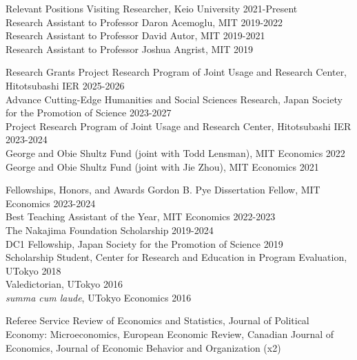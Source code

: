 \documentclass{resume} %
\begin{document}
\clearpage
\begin{rSection}{Relevant Positions}
Visiting Researcher, Keio University \hfill 2021-Present \\
Research Assistant to Professor Daron Acemoglu, MIT \hfill 2019-2022\\
Research Assistant to Professor David Autor, MIT \hfill 2019-2021\\
Research Assistant to Professor Joshua Angrist, MIT \hfill 2019
\end{rSection}

\begin{rSection}{Research Grants}
Project Research Program of Joint Usage and Research Center, Hitotsubashi IER \hfill 2025-2026\\
Advance Cutting-Edge Humanities and Social Sciences Research, Japan Society for the Promotion of Science
 \hfill 2023-2027\\
Project Research Program of Joint Usage and Research Center, Hitotsubashi IER \hfill 2023-2024\\
George and Obie Shultz Fund (joint with Todd Lensman), MIT Economics \hfill 2022\\
George and Obie Shultz Fund (joint with Jie Zhou), MIT  Economics \hfill 2021
\end{rSection}

\begin{rSection}{Fellowships, Honors, and Awards}
Gordon B. Pye Dissertation Fellow, MIT Economics \hfill 2023-2024\\
Best Teaching Assistant of the Year, MIT Economics \hfill 2022-2023\\
The Nakajima Foundation Scholarship \hfill 2019-2024\\
DC1 Fellowship, Japan Society for the Promotion of Science
 \hfill 2019\\
Scholarship Student, Center for Research and Education in Program Evaluation, UTokyo \hfill 2018\\
Valedictorian, UTokyo \hfill 2016\\
\textit{summa cum laude}, UTokyo Economics \hfill 2016
\end{rSection}

\begin{rSection}{Referee Service}
Review of Economics and Statistics, Journal of Political Economy: Microeconomics, European Economic Review, Canadian Journal of Economics, Journal of Economic Behavior and Organization (x2)
\end{rSection}
\end{document}
